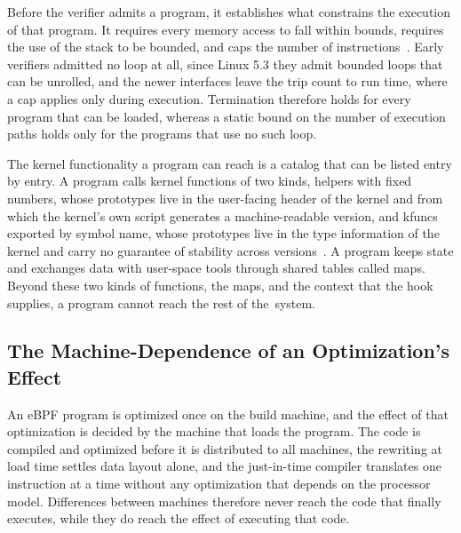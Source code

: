 Before the verifier admits a program, it establishes what constrains the execution of that program.
It requires every memory access to fall within bounds, requires the use of the stack to be bounded, and caps the number of instructions~\cite{gershuni2019simple,linuxkernel-bpf-verifier}.
Early verifiers admitted no loop at all, since Linux 5.3 they admit bounded loops that can be unrolled, and the newer interfaces leave the trip count to run time, where a cap applies only during execution.
Termination therefore holds for every program that can be loaded, whereas a static bound on the number of execution paths holds only for the programs that use no such loop.

The kernel functionality a program can reach is a catalog that can be listed entry by entry.
A program calls kernel functions of two kinds, helpers with fixed numbers, whose prototypes live in the user-facing header of the kernel and from which the kernel's own script generates a machine-readable version, and kfuncs exported by symbol name, whose prototypes live in the type information of the kernel and carry no guarantee of stability across versions~\cite{gbadamosi2024ebpf}.
A program keeps state and exchanges data with user-space tools through shared tables called maps.
Beyond these two kinds of functions, the maps, and the context that the hook supplies, a program cannot reach the rest of the~system.

\subsection{The Machine-Dependence of an Optimization's Effect}\label{sec:need}

An eBPF program is optimized once on the build machine, and the effect of that optimization is decided by the machine that loads the program.
The code is compiled and optimized before it is distributed to all machines, the rewriting at load time settles data layout alone, and the just-in-time compiler translates one instruction at a time without any optimization that depends on the processor model.
Differences between machines therefore never reach the code that finally executes, while they do reach the effect of executing that code.

